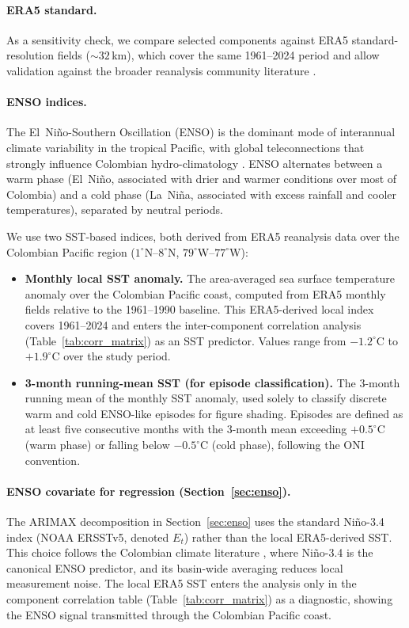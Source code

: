 \documentclass[12pt]{article}
\begin{document}
\paragraph{ERA5 standard.} As a sensitivity check, we compare selected components against ERA5 standard-resolution fields (${\sim}32$\,km), which cover the same 1961--2024 period and allow validation against the broader reanalysis community literature \citep{dinku2018}.
 
\paragraph{ENSO indices.} The El~Ni\~no-Southern Oscillation (ENSO) is the dominant mode of interannual climate variability in the tropical Pacific, with global teleconnections that strongly influence Colombian hydro-climatology \citep{poveda2011}. ENSO alternates between a warm phase (El~Ni\~no, associated with drier and warmer conditions over most of Colombia) and a cold phase (La~Ni\~na, associated with excess rainfall and cooler temperatures), separated by neutral periods.
 
We use two SST-based indices, both derived from ERA5 reanalysis data over the Colombian Pacific region ($1^\circ$N--$8^\circ$N, $79^\circ$W--$77^\circ$W):

\begin{itemize}
\item \textbf{Monthly local SST anomaly.} The area-averaged sea surface temperature anomaly over the Colombian Pacific coast, computed from ERA5 monthly fields relative to the 1961--1990 baseline. This ERA5-derived local index covers 1961--2024 and enters the inter-component correlation analysis (Table~\ref{tab:corr_matrix}) as an SST predictor. Values range from $-1.2^\circ$C to $+1.9^\circ$C over the study period.

\item \textbf{3-month running-mean SST (for episode classification).} The 3-month running mean of the monthly SST anomaly, used solely to classify discrete warm and cold ENSO-like episodes for figure shading. Episodes are defined as at least five consecutive months with the 3-month mean exceeding $+0.5^\circ$C (warm phase) or falling below $-0.5^\circ$C (cold phase), following the ONI convention.
\end{itemize}
 
\paragraph{ENSO covariate for regression (Section~\ref{sec:enso}).} The ARIMAX decomposition in Section~\ref{sec:enso} uses the standard Ni\~no-3.4 index (NOAA ERSSTv5, denoted $E_t$) rather than the local ERA5-derived SST. This choice follows the Colombian climate literature \citep{poveda2011,morales2021wavelet}, where Ni\~no-3.4 is the canonical ENSO predictor, and its basin-wide averaging reduces local measurement noise. The local ERA5 SST enters the analysis only in the component correlation table (Table~\ref{tab:corr_matrix}) as a diagnostic, showing the ENSO signal transmitted through the Colombian Pacific coast.
 
\end{document}
